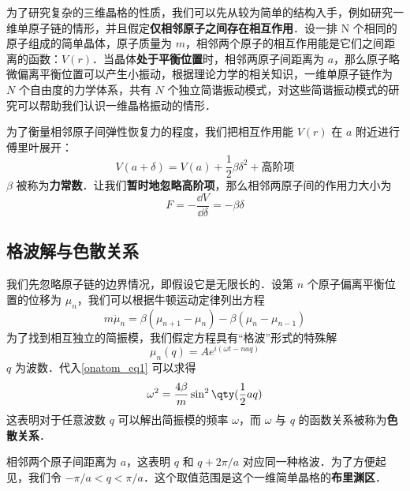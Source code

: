 
\begin{issues}
\issueTODO
\end{issues}


为了研究复杂的三维晶格的性质，我们可以先从较为简单的结构入手，例如研究一维单原子链的情形，并且假定\textbf{仅相邻原子之间存在相互作用}．设一排 N 个相同的原子组成的简单晶体，原子质量为 $m$，相邻两个原子的相互作用能是它们之间距离的函数：$V(r)$．当晶体\textbf{处于平衡位置}时，相邻两原子间距离为 $a$，那么原子略微偏离平衡位置可以产生小振动，根据理论力学的相关知识，一维单原子链作为 $N$ 个自由度的力学体系，共有 $N$ 个独立简谐振动模式，对这些简谐振动模式的研究可以帮助我们认识一维晶格振动的情形．

为了衡量相邻原子间弹性恢复力的程度，我们把相互作用能 $V(r)$ 在 $a$ 附近进行傅里叶展开：
\begin{equation}
V(a+\delta)=V(a)+\frac{1}{2}\beta \delta^2+\text{高阶项}
\end{equation}
$\beta$ 被称为\textbf{力常数}．让我们\textbf{暂时地忽略高阶项}，那么相邻两原子间的作用力大小为
\begin{equation}
F=-\frac{\dd V}{\dd \delta}=-\beta\delta
\end{equation}

\subsection{格波解与色散关系}
我们先忽略原子链的边界情况，即假设它是无限长的．设第 $n$ 个原子偏离平衡位置的位移为 $\mu_n$，我们可以根据牛顿运动定律列出方程
\begin{equation}\label{onatom_eq1}
m \ddot \mu_n = \beta(\mu_{n+1}-\mu_n)-\beta(\mu_n - \mu_{n-1})
\end{equation}
为了找到相互独立的简振模，我们假定方程具有“格波”形式的特殊解
\begin{equation}\label{onatom_eq2}
\mu_{n}(q)=Ae^{i(\omega t-naq)}
\end{equation}
$q$ 为波数．代入\autoref{onatom_eq1} 可以求得
\begin{equation}\label{onatom_eq3}
\omega^2=\frac{4\beta}{m}\sin^2 \qty(\frac{1}{2}aq)
\end{equation}
这表明对于任意波数 $q$ 可以解出简振模的频率 $\omega$，而 $\omega$ 与 $q$ 的函数关系被称为\textbf{色散关系}．

相邻两个原子间距离为 $a$，这表明 $q$ 和 $q+2\pi/a$ 对应同一种格波．为了方便起见，我们令 $-\pi/a<q<\pi/a$．这个取值范围是这个一维简单晶格的\textbf{布里渊区}．


